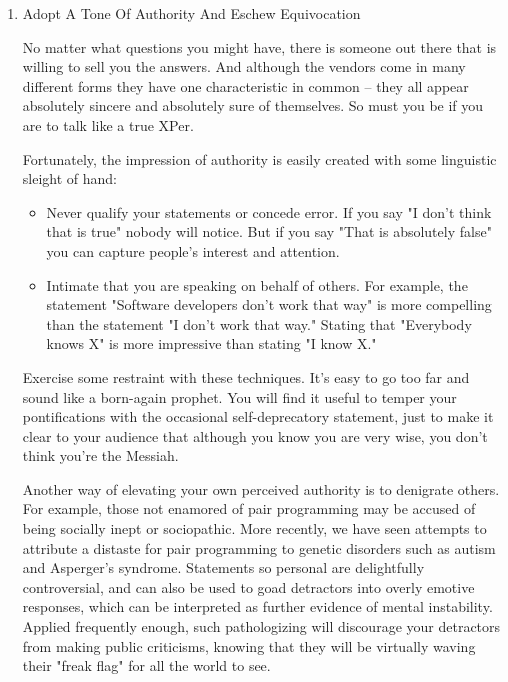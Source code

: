 \documentclass{article}
\begin{document}
\begin{enumerate}
\item Adopt A Tone Of Authority And Eschew Equivocation
\label{sec:orgheadline205}

No matter what questions you might have, there is someone out there that
is willing to sell you the answers. And although the vendors come in
many different forms they have one characteristic in common -- they all
appear absolutely sincere and absolutely sure of themselves. So must you
be if you are to talk like a true XPer.

Fortunately, the impression of authority is easily created with some
linguistic sleight of hand:

\begin{itemize}
\item Never qualify your statements or concede error. If you say "I don't
think that is true" nobody will notice. But if you say "That is
absolutely false" you can capture people's interest and attention.\\
\item Intimate that you are speaking on behalf of others. For example, the
statement "Software developers don't work that way" is more
compelling than the statement "I don't work that way." Stating that
"Everybody knows X" is more impressive than stating "I know X."
\end{itemize}

Exercise some restraint with these techniques. It's easy to go too far
and sound like a born-again prophet. You will find it useful to temper
your pontifications with the occasional self-deprecatory statement, just
to make it clear to your audience that although you know you are very
wise, you don't think you're the Messiah.

Another way of elevating your own perceived authority is to denigrate
others. For example, those not enamored of pair programming may be
accused of being socially inept or sociopathic. More recently, we have
seen attempts to attribute a distaste for pair programming to genetic
disorders such as autism and Asperger's syndrome. Statements so personal
are delightfully controversial, and can also be used to goad detractors
into overly emotive responses, which can be interpreted as further
evidence of mental instability. Applied frequently enough, such
pathologizing will discourage your detractors from making public
criticisms, knowing that they will be virtually waving their "freak
flag" for all the world to see.


\end{enumerate}
\end{document}
